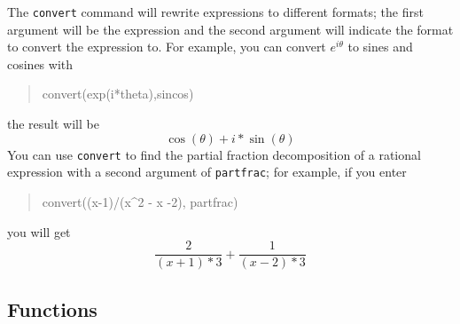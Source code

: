\documentclass{article}
\newcommand{\xcasin}[1]
{\begin{quote}\ttfamily
#1
\end{quote}}
\newcommand{\xcasout}[1]
{\begin{equation*}
#1
\end{equation*}}
\begin{document}
The \texttt{convert} command will rewrite expressions to different
formats; the first argument will be the expression and the second
argument will indicate the format to convert the expression to.  For
example, you can convert $e^{i \theta}$ to sines and 
cosines with
\xcasin{convert(exp(i*theta),sincos)}
the result will be
\xcasout{\cos(\theta) + i*\sin(\theta)}
You can use \texttt{convert} to find the partial fraction
decomposition of a rational expression with a second argument of
\texttt{partfrac}; 
for example, if you enter
\xcasin{convert((x-1)/(x\^{}2 - x -2), partfrac)}
you will get
\xcasout{\frac{2}{(x+1)*3} + \frac{1}{(x-2)*3}}


\subsection{Functions}
\end{document}
